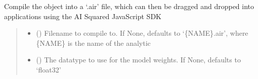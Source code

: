 \documentclass[letterpaper,10pt,english]{sphinxmanual}
\begin{document}
\begin{fulllineitems}
\begin{fulllineitems}
\label{\detokenize{aisquared.config:aisquared.config.ModelConfiguration.ModelConfiguration.auto_run}}
\pysigstartsignatures
{}
\pysigstopsignatures
\end{fulllineitems}


\begin{fulllineitems}
\label{\detokenize{aisquared.config:aisquared.config.ModelConfiguration.ModelConfiguration.compile}}
\pysigstartsignatures
{}
\pysigstopsignatures
\sphinxAtStartPar
Compile the object into a ‘.air’ file, which can then be dragged and
dropped into applications using the AI Squared JavaScript SDK
\begin{quote}\begin{description}
\begin{itemize}
\item {} 
\sphinxAtStartPar
{} (\sphinxstyleliteralemphasis{\sphinxupquote{ (}}\sphinxstyleliteralemphasis{\sphinxupquote{)}}) \textendash{} Filename to compile to. If None, defaults to ‘\{NAME\}.air’, where \{NAME\} is the
name of the analytic

\item {} 
\sphinxAtStartPar
{} (\sphinxstyleliteralemphasis{\sphinxupquote{ (}}\sphinxstyleliteralemphasis{\sphinxupquote{)}}) \textendash{} The datatype to use for the model weights. If None, defaults to ‘float32’


\end{itemize}
\end{description}
\end{quote}
\end{fulllineitems}
\end{fulllineitems}
\end{document}
